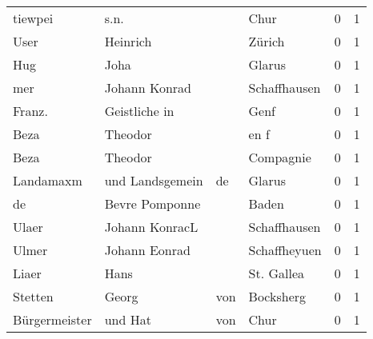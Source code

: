 \begin{tabular}{llllrr}
                  tiewpei &                               s.n. &             &                                        Chur &          0 &         1 \\
                     User &                           Heinrich &             &                                      Zürich &          0 &         1 \\
                      Hug &                               Joha &             &                                      Glarus &          0 &         1 \\
                      mer &                      Johann Konrad &             &                                Schaffhausen &          0 &         1 \\
                   Franz. &                      Geistliche in &             &                                        Genf &          0 &         1 \\
                     Beza &                            Theodor &             &                                        en f &          0 &         1 \\
                     Beza &                            Theodor &             &                                   Compagnie &          0 &         1 \\
                Landamaxm &                    und Landsgemein &          de &                                      Glarus &          0 &         1 \\
                       de &                     Bevre Pomponne &             &                                       Baden &          0 &         1 \\
                    Ulaer &                     Johann KonracL &             &                                Schaffhausen &          0 &         1 \\
                    Ulmer &                      Johann Eonrad &             &                                Schaffheyuen &          0 &         1 \\
                    Liaer &                               Hans &             &                                  St. Gallea &          0 &         1 \\
                  Stetten &                              Georg &         von &                                   Bocksherg &          0 &         1 \\
            Bürgermeister &                            und Hat &         von &                                        Chur &          0 &         1 \\

\end{tabular}
